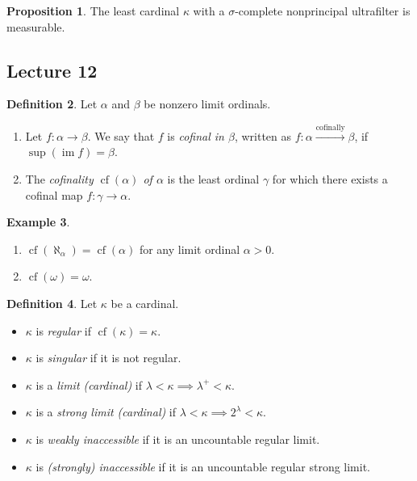 \documentclass[10pt,letterpaper,cm]{nupset}
\theoremstyle{definition}
\newtheorem{definition}{Definition}[subsection]
\newtheorem{exmp}[definition]{Example}
\theoremstyle{theorem}
\newtheorem{prop}[definition]{Proposition}
\theoremstyle{remark}
\newcommand{\1}{\mathbf{1}}
\newcommand{\0}{\vec 0}
\DeclareMathOperator{\im}{im}
\DeclareMathOperator{\cf}{cf}
\begin{document}
\begin{prop}
The least cardinal $\kappa$  with a $\sigma$-complete nonprincipal ultrafilter is measurable. 
\end{prop}

\subsection{Lecture 12}

\begin{definition}
Let $\alpha$ and $\beta$ be nonzero limit ordinals. 
\begin{enumerate}
\item Let $f: \alpha \to \beta$. We say that $f$ is \textit{cofinal in $\beta$}, written as \textit{$f : \alpha \xrightarrow{\text{cofinally}} \beta$}, if $\sup(\im{f}) = \beta$. 
\item The \textit{cofinality $\cf(\alpha)$  of $\alpha$} is the least ordinal $\gamma$ for which there exists a cofinal map $f: \gamma \to \alpha$.
\end{enumerate}
\end{definition}

\begin{exmp} $ $
\begin{enumerate}
\item $\cf(\aleph_{\alpha}) = \cf(\alpha)$ for any limit ordinal $\alpha >0$.
\item $\cf(\omega) =  \omega$.
\end{enumerate}
\end{exmp}


\begin{definition} Let $\kappa$ be a cardinal.
\begin{itemize}
\item $\kappa$ is \textit{regular} if $\cf(\kappa) = \kappa$.
\item $\kappa$ is \textit{singular} if it is not regular.
\item $\kappa$ is a \textit{limit (cardinal)} if $\lambda <\kappa \implies \lambda^+ < \kappa$.
\item $\kappa$ is a \textit{strong limit (cardinal)} if $\lambda < \kappa \implies 2^{\lambda} < \kappa$.
\item $\kappa$ is \textit{weakly inaccessible}  if it is an uncountable  regular limit.
\item $\kappa$ is \textit{(strongly) inaccessible} if it is an uncountable regular strong limit.
\end{itemize} 
\end{definition}
\end{document}
